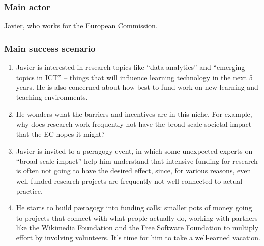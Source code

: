 \subsubsection{Main actor}

Javier, who works for the European Commission.

\subsubsection{Main success scenario}

\begin{enumerate}
\item
  Javier is interested in research topics like ``data analytics'' and
  ``emerging topics in ICT'' -- things that will influence learning
  technology in the next 5 years. He is also concerned about how best to
  fund work on new learning and teaching environments.
\item
  He wonders what the barriers and incentives are in this niche. For
  example, why does research work frequently not have the broad-scale
  societal impact that the EC hopes it might?
\item
  Javier is invited to a pæragogy event, in which some unexpected
  experts on ``broad scale impact'' help him understand that intensive
  funding for research is often not going to have the desired effect,
  since, for various reasons, even well-funded research projects are
  frequently not well connected to actual practice.
\item
  He starts to build pæragogy into funding calls: smaller pots of money
  going to projects that connect with what people actually do, working
  with partners like the Wikimedia Foundation and the Free Software
  Foundation to multiply effort by involving volunteers. It's time for
  him to take a well-earned vacation.
\end{enumerate}
